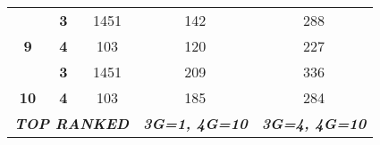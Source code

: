 \begin{table}
\begin{tabular}{|c|c|c|c|c|}
 & \textbf{3} & 1451 & 142 & 288 \\ \cline{2-5} 
\multirow{-2}{*}{\textbf{9}} & \textbf{4} & 103 & \cellcolor[HTML]{C0C0C0}120 & \cellcolor[HTML]{C0C0C0}227 \\ \hline
 & \textbf{3} & 1451 & 209 & 336 \\ \cline{2-5} 
\multirow{-2}{*}{\textbf{10}} & \textbf{4} & 103 & \cellcolor[HTML]{C0C0C0}185 & \cellcolor[HTML]{C0C0C0}284 \\ \hline
\multicolumn{3}{|c|}{\textit{\textbf{TOP RANKED}}} & \textit{\textbf{3G=1, 4G=10}} & \textit{\textbf{3G=4, 4G=10}} \\ \hline
\end{tabular}
\end{table}